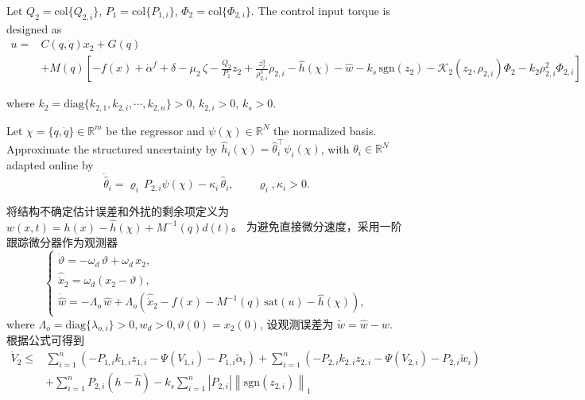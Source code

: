 \documentclass[pdflatex,sn-mathphys-num]{sn-jnl}%
\theoremstyle{thmstyleone}%
\theoremstyle{thmstyletwo}%
\theoremstyle{thmstylethree}%
\begin{document}
Let $Q_2=\mathrm{col}\{Q_{2,i}\}$,
$P_1=\mathrm{col}\{P_{1,i}\}$,
$\Phi_2=\mathrm{col}\{\Phi_{2,i}\}$. The control input torque is designed as
\begin{equation}\label{eq:tau-cmd}
\begin{aligned}
u =&C(q,\dot{q})x_2 + G(q)\\
&+M(q)\left[-f(x)+\dot\alpha^{f}+\delta -\mu_2\,\zeta-\frac{Q_2}{P_1}z_2+\tfrac{z_{2}^{3}}{\rho_{2,i}^{3}}\dot\rho_{2,i}
-\hat{h}(\chi)
-\hat w
-k_s\,\mathrm{sgn}(z_{2})-\mathcal{K}_{2}(z_{2},\rho_{2,i}) \Phi_{2}-k_{2}\rho_{2,i}^2 \Phi_{2,i}\right]
\end{aligned}
\end{equation}


where $k_2=\mathrm{diag}\{k_{2,1},k_{2,i},\cdots,k_{2,n}\}>0$, $k_{2,i}>0$, $k_s>0$.

Let $\chi=\{q,\dot{q}\}\in\mathbb{R}^m$ be the regressor and $\psi(\chi)\in\mathbb{R}^{N}$ the normalized basis. Approximate the structured uncertainty by 
\( \hat h_i(\chi)=\hat \theta_i^\top \psi_i(\chi)\),
with $\theta_i\in\mathbb{R}^{N}  $ adapted online by
\begin{equation}\label{eq:theta-law}
\dot{\hat{\theta}}_i = \varrho_i\,P_{2,i}\psi(\chi) - \kappa_i\,\hat{\theta}_i,\qquad
\varrho_i,\kappa_i>0.
\end{equation}


将结构不确定估计误差和外扰的剩余项定义为
$w(x,t)=h(x)-\hat h(\chi)+ M^{-1}(q) d(t)$。
为避免直接微分速度，采用一阶跟踪微分器作为观测器
\begin{equation}
	\begin{cases}
\dot\vartheta =-\omega_d\,\vartheta+\omega_d\,x_2,  \\
\hat{\dot x}_2=\omega_d(x_2-\vartheta),   \\
\dot{\hat w}= -\Lambda_o\,\hat w
+\Lambda_o\left(\hat{\dot x}_2 - f(x) - M^{-1}(q)\,\mathrm{sat}(u) - \hat h(\chi)\right),
\end{cases}
\end{equation}
where $\Lambda_o=\mathrm{diag}\{\lambda_{o,i}\}>0, w_d>0, \vartheta(0)=x_2(0)$,
设观测误差为 $\tilde w=\hat w-w$.
根据公式可得到
\begin{equation}
	\begin{aligned}
	\dot V_2
\le&
\sum_{i=1}^n \left( -P_{1,i} k_{1,i}z_{1,i}-\Psi(V_{1,i})-P_{1,i}\tilde\alpha_i\right)
+\sum_{i=1}^n \left( -P_{2,i} k_{2,i}z_{2,i}-\Psi(V_{2,i})-P_{2,i}\tilde{w}_i  \right)\\
&+\sum_{i=1}^n P_{2,i}(h-\hat{h}) -k_s\sum_{i=1}^n |P_{2,i}|\left\lVert  \mathrm{sgn}(z_{2,i})  \right\rVert_1
\end{aligned}
\end{equation}
\end{document}
